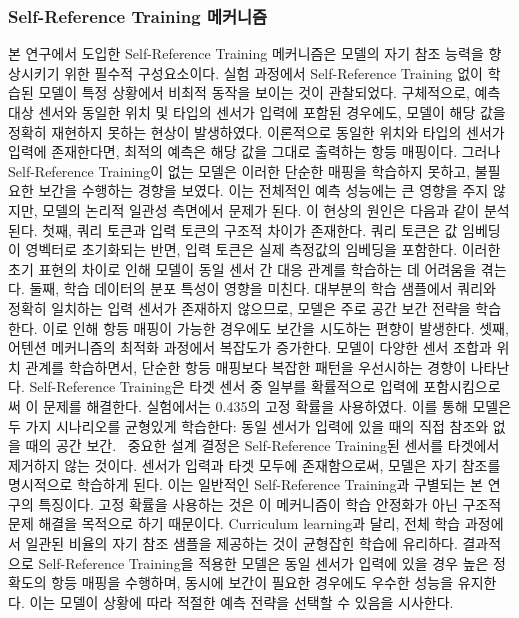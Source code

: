 \documentclass[final,5p,times,twocolumn,authoryear]{elsarticle}
\begin{document}
\subsubsection{Self-Reference Training 메커니즘}
본 연구에서 도입한 Self-Reference Training 메커니즘은 모델의 자기 참조 능력을 향상시키기 위한 필수적 구성요소이다. 실험 과정에서 Self-Reference Training 없이 학습된 모델이 특정 상황에서 비최적 동작을 보이는 것이 관찰되었다. 구체적으로, 예측 대상 센서와 동일한 위치 및 타입의 센서가 입력에 포함된 경우에도, 모델이 해당 값을 정확히 재현하지 못하는 현상이 발생하였다.
이론적으로 동일한 위치와 타입의 센서가 입력에 존재한다면, 최적의 예측은 해당 값을 그대로 출력하는 항등 매핑이다. 그러나 Self-Reference Training이 없는 모델은 이러한 단순한 매핑을 학습하지 못하고, 불필요한 보간을 수행하는 경향을 보였다. 이는 전체적인 예측 성능에는 큰 영향을 주지 않지만, 모델의 논리적 일관성 측면에서 문제가 된다.
이 현상의 원인은 다음과 같이 분석된다. 첫째, 쿼리 토큰과 입력 토큰의 구조적 차이가 존재한다. 쿼리 토큰은 값 임베딩이 영벡터로 초기화되는 반면, 입력 토큰은 실제 측정값의 임베딩을 포함한다. 이러한 초기 표현의 차이로 인해 모델이 동일 센서 간 대응 관계를 학습하는 데 어려움을 겪는다.
둘째, 학습 데이터의 분포 특성이 영향을 미친다. 대부분의 학습 샘플에서 쿼리와 정확히 일치하는 입력 센서가 존재하지 않으므로, 모델은 주로 공간 보간 전략을 학습한다. 이로 인해 항등 매핑이 가능한 경우에도 보간을 시도하는 편향이 발생한다.
셋째, 어텐션 메커니즘의 최적화 과정에서 복잡도가 증가한다. 모델이 다양한 센서 조합과 위치 관계를 학습하면서, 단순한 항등 매핑보다 복잡한 패턴을 우선시하는 경향이 나타난다.
Self-Reference Training은 타겟 센서 중 일부를 확률적으로 입력에 포함시킴으로써 이 문제를 해결한다. 실험에서는 0.435의 고정 확률을 사용하였다. 이를 통해 모델은 두 가지 시나리오를 균형있게 학습한다: 동일 센서가 입력에 있을 때의 직접 참조와 없을 때의 공간 보간. 
중요한 설계 결정은 Self-Reference Training된 센서를 타겟에서 제거하지 않는 것이다. 센서가 입력과 타겟 모두에 존재함으로써, 모델은 자기 참조를 명시적으로 학습하게 된다. 이는 일반적인 Self-Reference Training과 구별되는 본 연구의 특징이다.
고정 확률을 사용하는 것은 이 메커니즘이 학습 안정화가 아닌 구조적 문제 해결을 목적으로 하기 때문이다. Curriculum learning과 달리, 전체 학습 과정에서 일관된 비율의 자기 참조 샘플을 제공하는 것이 균형잡힌 학습에 유리하다.
결과적으로 Self-Reference Training을 적용한 모델은 동일 센서가 입력에 있을 경우 높은 정확도의 항등 매핑을 수행하며, 동시에 보간이 필요한 경우에도 우수한 성능을 유지한다. 이는 모델이 상황에 따라 적절한 예측 전략을 선택할 수 있음을 시사한다.
\end{document}
